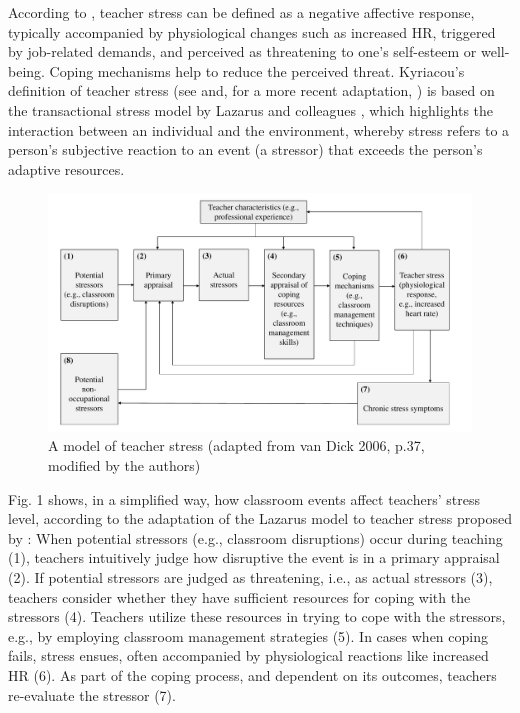 \documentclass[preprint, 3p,
sort,]{elsarticle} %
\begin{document}
According to \citet{kyriacou1978}, teacher stress can be defined as a
negative affective response, typically accompanied by physiological
changes such as increased HR, triggered by job-related demands, and
perceived as threatening to one's self-esteem or well-being. Coping
mechanisms help to reduce the perceived threat. Kyriacou's definition of
teacher stress (see \citet{kyriacou1978} and, for a more recent
adaptation, \citet{van2006stress}) is based on the transactional stress
model by Lazarus and colleagues
\citep{lazarus1966psychological, lazarus1990theory}, which highlights
the interaction between an individual and the environment, whereby
stress refers to a person's subjective reaction to an event (a stressor)
that exceeds the person's adaptive resources.

\begin{figure}[htbp]
  \centering
  \includegraphics[width=1\textwidth]{images/Model_Teacher_Stress_adapted_new.pdf}
  \caption{A model of teacher stress (adapted from van Dick 2006, p.37, modified by the authors)}
  \label{A model of teacher stress (adapted from van Dick 2006, p.37, modified by the authors)}
\end{figure}

Fig. 1 shows, in a simplified way, how classroom events affect teachers'
stress level, according to the adaptation of the Lazarus model to
teacher stress proposed by \citet{van2006stress}: When potential
stressors (e.g., classroom disruptions) occur during teaching (1),
teachers intuitively judge how disruptive the event is in a primary
appraisal (2). If potential stressors are judged as threatening, i.e.,
as actual stressors (3), teachers consider whether they have sufficient
resources for coping with the stressors (4). Teachers utilize these
resources in trying to cope with the stressors, e.g., by employing
classroom management strategies (5). In cases when coping fails, stress
ensues, often accompanied by physiological reactions like increased HR
(6). As part of the coping process, and dependent on its outcomes,
teachers re-evaluate the stressor (7).
\end{document}
